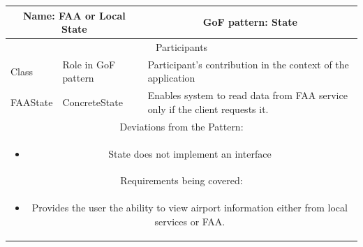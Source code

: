 \begin{center}
    \begin{tabular}{ |p{4cm}|p{4cm}|p{7cm}|  }
        \hline
        \multicolumn{2}{|c|}{Name: FAA or Local State} & \multicolumn{1}{|c|}{GoF pattern: State} \\
        \hline
        \multicolumn{3}{|c|}{Participants} \\
        \hline
        Class & Role in GoF pattern & Participant's contribution in the context of the application \\
        \hline \hline

        FAAState & ConcreteState &
        Enables system to read data from FAA service only if the client requests it.
        \\
        \hline

        \hline
        \multicolumn{3}{|c|}{Deviations from the Pattern:} \\ \multicolumn{3}{|c|}{\parbox{0.9\textwidth}{
        \begin{itemize}
            \item State does not implement an interface
        \end{itemize} }} \\
        \hline
        \multicolumn{3}{|c|}{Requirements being covered:} \\ \multicolumn{3}{|c|}{\parbox{0.9\textwidth}{
        \begin{itemize}
            \item Provides the user the ability to view airport information either from local services or FAA.
        \end{itemize} }} \\
        \hline
    \end{tabular}
\end{center}

\newpage
    